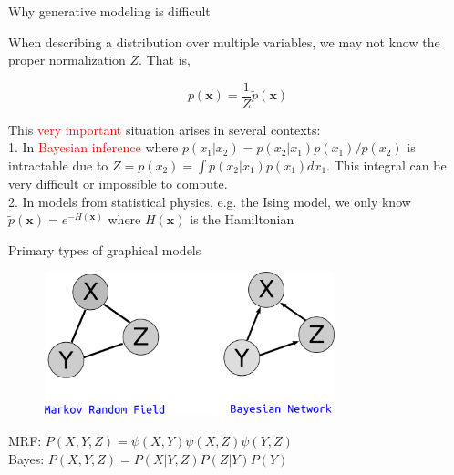 \documentclass{beamer}					%
\begin{document}
\begin{frame}{Why generative modeling is difficult}

When describing a distribution over multiple variables, we may not know the proper normalization $Z$. That is,

\begin{equation*}
p(\mathbf{x}) = \frac{1}{Z}\tilde{p}(\mathbf{x})
\end{equation*}

\vspace{0.1in}
This \textcolor{red}{very important} situation arises in several contexts:\\
\vspace{0.1in}
1. In \textcolor{red}{Bayesian inference} where $p(x_{1}|x_{2}) = p(x_{2}|x_{1})p(x_{1})/p(x_{2})$ is intractable due to $Z = p(x_{2}) = \int p(x_{2}|x_{1})p(x_{1})dx_{1}$. This integral can be very difficult or impossible to
compute.\\
\vspace{0.1in}
2. In models from statistical physics, e.g. the Ising model, we only know
$\tilde{p}(\mathbf{x}) = e^{−H(\mathbf{x})}$ where $H(\mathbf{x})$ is the Hamiltonian

\end{frame}

\begin{frame}{Primary types of graphical models}

\begin{center}
\begin{figure}
\includegraphics[width=0.75\textwidth]{pgms}
\end{figure}
\end{center}
\vspace{0.1in}
MRF: $P(X,Y,Z) = \psi(X,Y)\psi(X,Z)\psi(Y,Z)$\\
\vspace{0.1in}
Bayes: $P(X,Y,Z) = P(X|Y,Z)P(Z|Y)P(Y)$

\end{frame}
\end{document}

